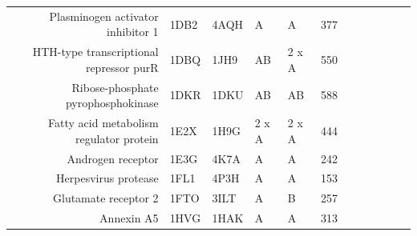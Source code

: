 \begin{table}
\begin{changemargin}{15mm}
\begin{scriptsize}
\begin{tabular}{ r p{0.8cm} p{0.8cm} p{0.8cm} p{0.8cm} l l l l l l l }
Plasminogen activator inhibitor 1                        & 1DB2 & 4AQH & A     & A     & 377 & \cellcolor[rgb]{ 1,  .494,  .475}    & \cellcolor[rgb]{ .573,  .816,  .314} & \cellcolor[rgb]{ 1,  .494,  .475}    & \cellcolor[rgb]{ .573,  .816,  .314} & \cellcolor[rgb]{ .573,  .816,  .314} & \cellcolor[rgb]{ .573,  .816,  .314} \\
HTH-type transcriptional repressor purR                  & 1DBQ & 1JH9 & AB    & 2 x A & 550 & \cellcolor[rgb]{ .573,  .816,  .314} & \cellcolor[rgb]{ 1,  .494,  .475}    & \cellcolor[rgb]{ 1,  .494,  .475}    & \cellcolor[rgb]{ 1,  .494,  .475}    & \cellcolor[rgb]{ 1,  .494,  .475}    & \cellcolor[rgb]{ 1,  .494,  .475}    \\
Ribose-phosphate pyrophosphokinase                       & 1DKR & 1DKU & AB    & AB    & 588 & \cellcolor[rgb]{ .573,  .816,  .314} & \cellcolor[rgb]{ 1,  .494,  .475}    & \cellcolor[rgb]{ .573,  .816,  .314} & \cellcolor[rgb]{ 1,  .494,  .475}    & \cellcolor[rgb]{ .573,  .816,  .314} & \cellcolor[rgb]{ 1,  .494,  .475}    \\
Fatty acid metabolism regulator protein                  & 1E2X & 1H9G & 2 x A & 2 x A & 444 & \cellcolor[rgb]{ 1,  .494,  .475}    & \cellcolor[rgb]{ 1,  .494,  .475}    & \cellcolor[rgb]{ 1,  .494,  .475}    & \cellcolor[rgb]{ .573,  .816,  .314} & \cellcolor[rgb]{ .573,  .816,  .314} & \cellcolor[rgb]{ .573,  .816,  .314} \\
Androgen receptor                                        & 1E3G & 4K7A & A     & A     & 242 & \cellcolor[rgb]{ 1,  .494,  .475}    & \cellcolor[rgb]{ 1,  .494,  .475}    & \cellcolor[rgb]{ 1,  .494,  .475}    & \cellcolor[rgb]{ 1,  .494,  .475}    & \cellcolor[rgb]{ 1,  .494,  .475}    & \cellcolor[rgb]{ 1,  .494,  .475}    \\
Herpesvirus protease                                     & 1FL1 & 4P3H & A     & A     & 153 & \cellcolor[rgb]{ 1,  .494,  .475}    & \cellcolor[rgb]{ .573,  .816,  .314} & \cellcolor[rgb]{ 1,  .494,  .475}    & \cellcolor[rgb]{ .573,  .816,  .314} & \cellcolor[rgb]{ .573,  .816,  .314} & \cellcolor[rgb]{ .573,  .816,  .314} \\
Glutamate receptor 2                                     & 1FTO & 3ILT & A     & B     & 257 & \cellcolor[rgb]{ 1,  .494,  .475}    & \cellcolor[rgb]{ 1,  .494,  .475}    & \cellcolor[rgb]{ .573,  .816,  .314} & \cellcolor[rgb]{ 1,  .494,  .475}    & \cellcolor[rgb]{ 1,  .494,  .475}    & \cellcolor[rgb]{ 1,  .494,  .475}    \\
Annexin A5                                               & 1HVG & 1HAK & A     & A     & 313 & \cellcolor[rgb]{ 1,  .494,  .475}    & \cellcolor[rgb]{ 1,  .494,  .475}    & \cellcolor[rgb]{ 1,  .494,  .475}    & \cellcolor[rgb]{ .573,  .816,  .314} & \cellcolor[rgb]{ .573,  .816,  .314} & \cellcolor[rgb]{ 1,  .494,  .475}    \\

\end{tabular}
\end{scriptsize}
\end{changemargin}
\end{table}
